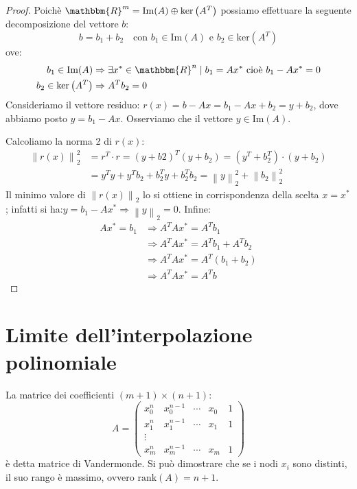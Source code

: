 \documentclass[12pt]{report}
\begin{document}
\begin{proof} Poichè $\mathbbm{R}^m = \text{Im}(A) \oplus \text{ker}\left(A^T\right)$ possiamo effettuare la seguente decomposizione del vettore $b$:
\[
b = b_1 + b_2 \quad \text{con } b_1 \in \text{Im}(A) \text{ e } b_2 \in \text{ker}\left(A^T\right)
\]
ove:
\begin{align*}
	b_1 \in \text{Im}(A) &\Rightarrow \exists x^* \in \mathbbm{R}^n \mid b_1 = Ax^* \text{ cioè } b_1 - Ax^* = 0 \\
	b_2 \in \text{ker}\left(A^T\right) &\Rightarrow A^Tb_2 = 0
\end{align*}
Consideriamo il vettore residuo: $r(x) = b - Ax = b_1 - Ax + b_2 = y + b_2$, dove abbiamo posto $y = b_1 - Ax$. Osserviamo che il vettore $y \in \text{Im}(A)$.

Calcoliamo la norma 2 di $r(x)$:
\begin{align*}
	\left\|r(x)\right\|_2^2 &= r^T \cdot r = (y + b2)^T(y+b_2) = (y^T + b_2^T) \cdot (y + b_2) \\
	&= y^Ty + y^Tb_2 + b_2^Ty + b_2^Tb_2 = \left\|y\right\|_2^2 + \left\|b_2\right\|_2^2
\end{align*}
Il minimo valore di $\left\|r(x)\right\|_2$ lo si ottiene in corrispondenza della scelta $x = x^*$; infatti si ha:$y = b_1 - Ax^* \Rightarrow \left\|y\right\|_2 = 0$. Infine:
\begin{align*}
Ax^* = b_1 &\Rightarrow A^TAx^* = A^Tb_1 \\
&\Rightarrow A^TAx^* = A^Tb_1 + A^Tb_2 \\
&\Rightarrow A^TAx^* = A^T(b_1 + b_2) \\
&\Rightarrow A^TAx^* = A^T b
\end{align*}
\end{proof}
\section{Limite dell'interpolazione polinomiale}
La matrice dei coefficienti $(m + 1) \times (n + 1)$:
\[
A = \begin{pmatrix}
	x_0^n & x_0^{n-1} & \cdots & x_0 & 1 \\
	x_1^n & x_1^{n-1} & \cdots & x_1 & 1 \\
	\vdots \\
	x_m^n & x_m^{n-1} & \cdots & x_m & 1
\end{pmatrix}
\]
è detta matrice di Vandermonde. Si può dimostrare che se i nodi $x_i$ sono distinti, il suo rango è massimo, ovvero $\text{rank}(A) = n + 1$.
\end{document}
